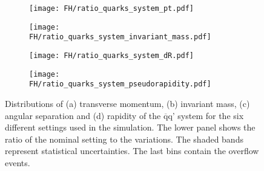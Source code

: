 \begin{figure}[H]
    \centering
    \begin{subfigure}{0.49\textwidth}
        \centering
        \texttt{[image: FH/ratio\_quarks\_system\_pt.pdf]}
        \caption{}
        \label{app:subfig:pt(qq)_FH}
    \end{subfigure}
    \begin{subfigure}{0.49\textwidth}
        \centering
        \texttt{[image: FH/ratio\_quarks\_system\_invariant\_mass.pdf]}
        \caption{}
        \label{app:subfig:m(qq)_FH}
    \end{subfigure}

    \vspace{0.2cm}
    
    \begin{subfigure}{0.49\textwidth}
        \centering
        \texttt{[image: FH/ratio\_quarks\_system\_dR.pdf]}
        \caption{}
        \label{app:subfig:dR(qq)_FH}
    \end{subfigure}
    \begin{subfigure}{0.49\textwidth}
        \centering
        \texttt{[image: FH/ratio\_quarks\_system\_pseudorapidity.pdf]}
        \caption{}
        \label{app:subfig:y(qq)_FH}
    \end{subfigure}
    \caption{Distributions of (a) transverse momentum, (b) invariant mass,  (c) angular separation and (d) rapidity of the $\overline{\text{q}}$q' system for the six different settings used in the simulation. The lower panel shows the ratio of the nominal setting to the variations. The shaded bands represent statistical uncertainties. The last bins contain the overflow events.}
    \label{app:fig:qqbar_FH}
\end{figure}




